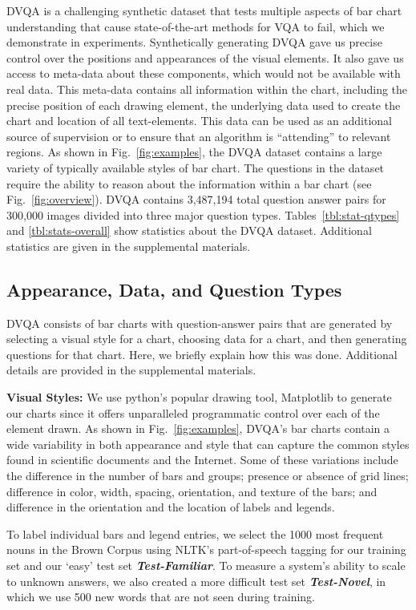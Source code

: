 \documentclass[10pt,twocolumn,letterpaper]{article}
\newcommand{\new}[1]{#1}
\begin{document}
DVQA is a challenging synthetic dataset that tests multiple aspects of bar chart understanding that cause state-of-the-art methods for VQA to fail, which we demonstrate in experiments. Synthetically generating DVQA gave us precise control over the positions and appearances of the visual elements. It also gave us access to meta-data about these components, which would not be available with real data. This meta-data contains all information within the chart, including the precise position of each drawing element, the underlying data used to create the chart and location of all text-elements. This data can be used as an additional source of supervision or to ensure that an algorithm is ``attending'' to relevant regions. As shown in Fig.~\ref{fig:examples}, the DVQA dataset contains a large variety of typically available styles of bar chart. The questions in the dataset require the ability to reason about the information within a bar chart (see Fig.~\ref{fig:overview}).  DVQA contains 3,487,194 total question answer pairs for 300,000 images divided into three major question types. Tables~\ref{tbl:stat-qtypes} and \ref{tbl:stats-overall} show  statistics about the DVQA dataset. Additional statistics are given in the supplemental materials.

\subsection{Appearance, Data, and Question Types}
DVQA consists of bar charts with question-answer pairs that are generated by selecting a visual style for a chart, choosing data for a chart, and then generating questions for that chart. Here, we briefly explain how this was done. Additional details are provided in the supplemental materials.

\textbf{Visual Styles: }\new{We use python's popular drawing tool, Matplotlib to generate our charts since it offers unparalleled programmatic control over each of the element drawn. As shown in Fig.~\ref{fig:examples}, DVQA's bar charts contain a wide variability in both appearance and style that can capture the common styles found in scientific documents and the Internet. Some of these variations include the difference in the number of bars and groups; presence or absence of grid lines; difference in color, width, spacing, orientation, and texture of the bars; and difference in the orientation and the location of labels and legends.}

To label individual bars and legend entries, we select the 1000 most frequent nouns in the Brown Corpus using NLTK's part-of-speech tagging for our training set and our `easy' test set \textbf{\textit{Test-Familiar}}. To measure a system's ability to scale to unknown answers, we also created a more difficult test set \textbf{\textit{Test-Novel}}, in which we use 500 new words that are not seen during training.
\end{document}
